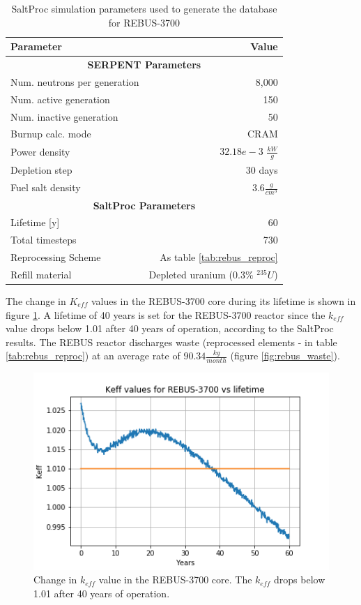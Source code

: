 \begin{table}[h]
	\centering
	\caption{SaltProc simulation parameters used to generate the database for REBUS-3700}
	\begin{tabular}{lr}
		\hline
		\textbf{Parameter} & \textbf{Value}\\
		\hline
		\multicolumn{2}{c}{\textbf{SERPENT Parameters}} \\
		\hline
		Num. neutrons per generation & 8,000 \\
		Num. active generation & 150\\
		Num. inactive generation & 50 \\
		Burnup calc. mode & CRAM \\
		Power density & $32.18e-3$ $\frac{kW}{g}$ \\ 
		Depletion step & 30 days\\
		Fuel salt density & $3.6 \frac{g}{cm^3}$ \\
		\hline
		\multicolumn{2}{c}{\textbf{SaltProc Parameters}} \\
		\hline
		Lifetime [y]  & 60 \\
		Total timesteps & 730 \\
		Reprocessing Scheme & As table \ref{tab:rebus_reproc}\\
		Refill material & Depleted uranium ($0.3\%$ $^{235}U$) \\
		\hline
	\end{tabular}
	\label{tab:saltproc-run-params}
\end{table}

The change in $K_{eff}$ values in the REBUS-3700 core during its lifetime is shown in figure \ref{fig:keff}.
A lifetime of 40 years is set for the REBUS-3700 reactor since the $k_{eff}$
value drops below 1.01 after 40 years of operation, according to the SaltProc results.
The REBUS reactor discharges
waste (reprocessed elements - in table \ref{tab:rebus_reproc}) at an average rate of
$90.34 \frac{kg}{month}$ (figure \ref{fig:rebus_waste}).


\begin{figure}[htbp!]
	\begin{center}
		\includegraphics[scale=0.7]{./images/us/keff.png}
	\end{center}
	\caption{Change in $k_{eff}$ value in the REBUS-3700 core. The $k_{eff}$ drops below
		1.01 after 40 years of operation.}
	\label{fig:keff}
\end{figure}

